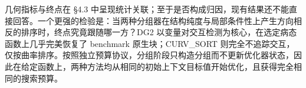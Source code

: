 几何指标与终点在 §4.3 中呈现统计关联；至于是否构成归因，现有结果还不能直接回答。一个更强的检验是：当两种分组器在结构纯度与局部条件性上产生方向相反的排序时，终点究竟跟随哪一方？DG2 以变量对交互检测为核心，在选定病态函数上几乎完美恢复了 benchmark 原生块；CURV\_SORT 则完全不追踪交互，仅按曲率排序。按照独立预算协议，分组阶段只构造分组而不更新优化器状态，因此在给定函数上，两种方法均从相同的初始上下文目标值开始优化，且获得完全相同的搜索预算。

